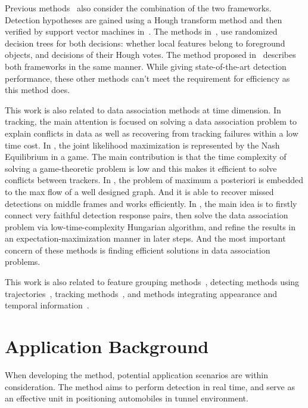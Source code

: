 Previous methods~\citep{ac34} also consider the combination of the two frameworks. Detection hypotheses are gained using a Hough transform method and then verified by support vector machines in~\citep{ac10,ac25}. The methods in~\citep{ac6,ac7}, use randomized decision trees for both decisions: whether local features belong to foreground objects, and decisions of their Hough votes. The method proposed in~\citep{ac27} describes both frameworks in the same manner. While giving state-of-the-art detection performance, these other methods can't meet the requirement for efficiency as this method does.







This work is also related to data association methods at time dimension. In tracking, the main attention is focused on solving a data
association problem to explain conflicts in data as well as
recovering from tracking failures within a low time cost. In
\citep{ij9}, the joint likelihood maximization is represented by the
Nash Equilibrium in a game. The main contribution is that the time
complexity of solving a game-theoretic problem is low and this makes it efficient to
solve conflicts between trackers. In
\citep{ij10}, the problem of maximum a posteriori is embedded to the max flow of a well designed
graph. And it is able to recover
missed detections on middle frames and works efficiently. In
\citep{my7}, the main idea is to firstly connect very faithful
detection response pairs, then solve the data association problem
via low-time-complexity Hungarian algorithm, and refine the results
in an expectation-maximization manner in later steps. And the most important concern of these methods
is finding efficient solutions in   data association problems.

This work is also related to feature grouping methods~\citep{ac25}, detecting methods using trajectories~\citep{my9,ac24}, tracking methods~\citep{my7,my10}, and methods integrating appearance and temporal information~\citep{ac23}.




\section{Application Background}
\label{ab}

When developing the method, potential application scenarios are within consideration. The method aims to perform detection in real time, and serve as an effective unit in positioning automobiles in tunnel environment.


